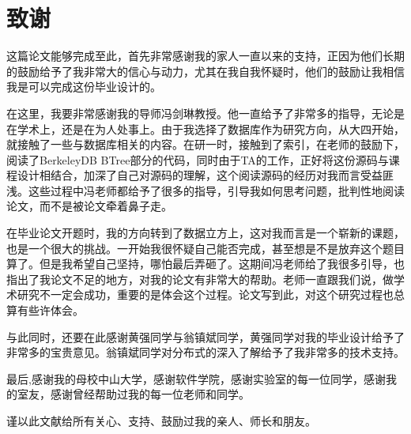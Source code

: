 
\chapter{致谢}

这篇论文能够完成至此，首先非常感谢我的家人一直以来的支持，正因为他们长期的鼓励给予了我非常大的信心与动力，尤其在我自我怀疑时，他们的鼓励让我相信我是可以完成这份毕业设计的。

在这里，我要非常感谢我的导师冯剑琳教授。他一直给予了非常多的指导，无论是在学术上，还是在为人处事上。由于我选择了数据库作为研究方向，从大四开始，就接触了一些与数据库相关的内容。在研一时，接触到了索引，在老师的鼓励下，阅读了BerkeleyDB BTree部分的代码，同时由于TA的工作，正好将这份源码与课程设计相结合，加深了自己对源码的理解，这个阅读源码的经历对我而言受益匪浅。这些过程中冯老师都给予了很多的指导，引导我如何思考问题，批判性地阅读论文，而不是被论文牵着鼻子走。

在毕业论文开题时，我的方向转到了数据立方上，这对我而言是一个崭新的课题，也是一个很大的挑战。一开始我很怀疑自己能否完成，甚至想是不是放弃这个题目算了。但是我希望自己坚持，哪怕最后弄砸了。这期间冯老师给了我很多引导，也指出了我论文不足的地方，对我的论文有非常大的帮助。老师一直跟我们说，做学术研究不一定会成功，重要的是体会这个过程。论文写到此，对这个研究过程也总算有些许体会。

与此同时，还要在此感谢黄强同学与翁镇斌同学，黄强同学对我的毕业设计给予了非常多的宝贵意见。翁镇斌同学对分布式的深入了解给予了我非常多的技术支持。

最后,感谢我的母校中山大学，感谢软件学院，感谢实验室的每一位同学，感谢我的室友，感谢曾经帮助过我的每一位老师和同学。

谨以此文献给所有关心、支持、鼓励过我的亲人、师长和朋友。\nopagebreak
